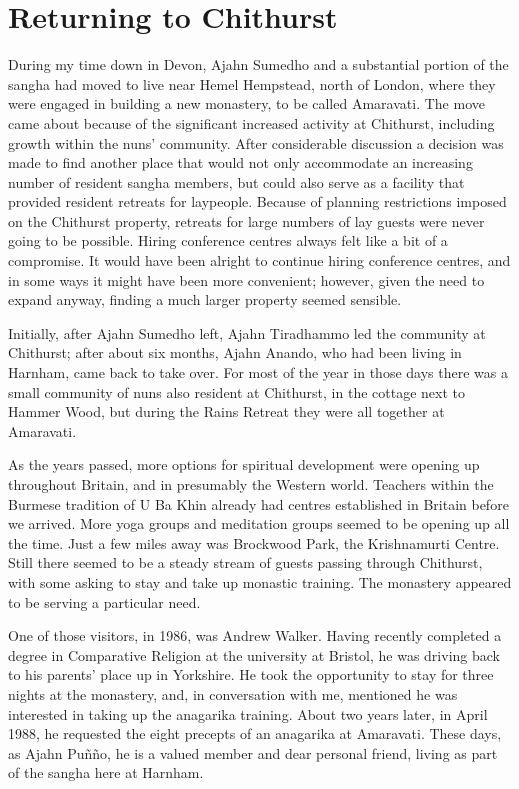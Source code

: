 \chapter{Returning to Chithurst}

During my time down in Devon, Ajahn Sumedho and a substantial portion of
the sangha had moved to live near Hemel Hempstead, north of London,
where they were engaged in building a new monastery, to be called
Amaravati\cite{amaravati}. The move came about because of the
significant increased activity at Chithurst,
including growth within the nuns' community. After considerable
discussion a decision was made to find another place that would not only
accommodate an increasing number of resident sangha members, but could
also serve as a facility that provided resident retreats for laypeople.
Because of planning restrictions imposed on the Chithurst
property, retreats for large numbers of lay guests were never going to
be possible. Hiring conference centres always felt like a bit of a
compromise. It would have been alright to continue hiring conference
centres, and in some ways it might have been more convenient; however,
given the need to expand anyway, finding a much larger property seemed
sensible.

Initially, after Ajahn Sumedho left, Ajahn Tiradhammo led the community
at Chithurst; after about six months, Ajahn Anando, who had been living
in Harnham, came back to take over. For most of the year in those days
there was a small community of nuns also resident at Chithurst, in the
cottage next to Hammer Wood, but during the Rains Retreat they were all
together at Amaravati.

As the years passed, more options for spiritual development were opening
up throughout Britain, and in presumably the Western world. Teachers
within the Burmese tradition of U Ba Khin already had centres
established in Britain before we arrived. More yoga groups and
meditation groups seemed to be opening up all the time.
Just a few miles away was Brockwood Park,
the Krishnamurti Centre. Still there seemed
to be a steady stream of guests passing through Chithurst, with some
asking to stay and take up monastic training. The monastery appeared to
be serving a particular need.

One of those visitors, in 1986, was Andrew Walker. Having recently
completed a degree in Comparative Religion at the university at Bristol,
he was driving back to his parents' place up in Yorkshire. He took the
opportunity to stay for three nights at the monastery, and, in
conversation with me, mentioned he was interested in taking up the
anagarika training. About two years later, in April 1988, he requested
the eight precepts of an anagarika at Amaravati. These days, as Ajahn
Puñño, he is a valued member and dear personal friend, living as part of
the sangha here at Harnham.

